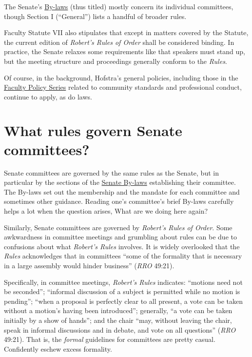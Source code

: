 \documentclass[12pt]{article}
\begin{document}
The Senate's
\href{https://www.hofstra.edu/sites/default/files/2022-04/senatebylaws.pdf}{By-laws}
(thus titled) mostly concern its individual committees, though Section I
(``General'') lists a handful of broader rules.

Faculty Statute VII also stipulates that except in matters covered by
the Statute, the current edition of \emph{Robert's Rules of Order} shall
be considered binding. In practice, the Senate relaxes some requirements
like that speakers must stand up, but the meeting structure and
proceedings generally conform to the \emph{Rules}.

Of course, in the background, Hofstra's general policies, including
those in the
\href{https://www.hofstra.edu/senate/faculty-policy-series.html}{Faculty
Policy Series} related to community standards and professional conduct,
continue to apply, as do laws.

\section{What rules govern Senate
committees?}\label{what-rules-govern-senate-committees}

Senate committees are governed by the same rules as the Senate, but in
particular by the sections of the
\href{https://www.hofstra.edu/sites/default/files/2022-04/senatebylaws.pdf}{Senate
By-laws} establishing their committee. The By-laws set out the
membership and the mandate for each committee and sometimes other
guidance. Reading one's committee's brief By-laws carefully helps a lot
when the question arises, What are we doing here again?

Similarly, Senate committees are governed by \emph{Robert's Rules of
Order}. Some awkwardness in committee meetings and grumbling about rules
can be due to confusions about what \emph{Robert's Rules} involves. It
is widely overlooked that the \emph{Rules} acknowledges that in
committees ``some of the formality that is necessary in a large assembly
would hinder business'' (\emph{RRO} 49:21).

Specifically, in committee meetings, \emph{Robert's Rules} indicates:
``motions need not be seconded''; ``informal discussion of a subject is
permitted while no motion is pending''; ``when a proposal is perfectly
clear to all present, a vote can be taken without a motion's having been
introduced''; generally, ``a vote can be taken initially by a show of
hands''; and the chair ``may, without leaving the chair, speak in
informal discussions and in debate, and vote on all questions''
(\emph{RRO} 49:21). That is, the \emph{formal} guidelines for committees
are pretty casual. Confidently eschew excess formality.
\end{document}
